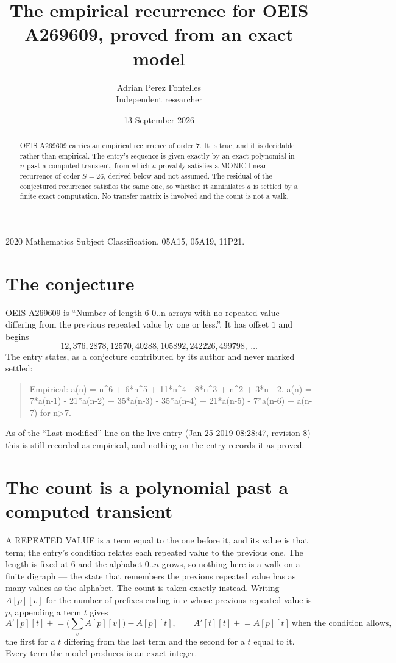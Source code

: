 \documentclass[11pt,a4paper]{article}
\title{The empirical recurrence for OEIS A269609, proved from an exact model}
\author{Adrian Perez Fontelles\\ \small Independent researcher}
\date{13 September 2026}
\theoremstyle{plain}
\theoremstyle{definition}
\begin{document}
\maketitle

\begin{abstract}
OEIS A269609 carries an empirical recurrence of order $7$. It is true, and it is
decidable rather than empirical. The entry's sequence is given exactly by an exact polynomial in $n$ past a computed transient, from
which $a$ provably satisfies a MONIC linear recurrence of order $S=26$, derived below and not
assumed. The residual of the conjectured recurrence satisfies the same one, so whether it
annihilates $a$ is settled by a finite exact computation. No transfer matrix is involved and
the count is not a walk.
\end{abstract}

\noindent\small 2020 Mathematics Subject Classification. 05A15, 05A19, 11P21.\normalsize

\section{The conjecture}

OEIS A269609 is ``Number of length-6 0..n arrays with no repeated value differing from the previous repeated value by one or less.''. It has offset $1$ and begins
\[
12, 376, 2878, 12570, 40288, 105892, 242226, 499798,\ \dots
\]
The entry states, as a conjecture contributed by its author and never marked settled:
\begin{quote}
Empirical: a(n) = n\^{}6 + 6*n\^{}5 + 11*n\^{}4 - 8*n\^{}3 + n\^{}2 + 3*n - 2. a(n) = 7*a(n-1) - 21*a(n-2) + 35*a(n-3) - 35*a(n-4) + 21*a(n-5) - 7*a(n-6) + a(n-7) for n>7.
\end{quote}
As of the ``Last modified'' line on the live entry (Jan 25 2019 08:28:47, revision 8)
this is still recorded as empirical, and nothing on the entry records it as proved.

\section{The count is a polynomial past a computed transient}

A REPEATED VALUE is a term equal to the one before it, and its value is that term; the entry's
condition relates each repeated value to the previous one. The length is fixed at $6$ and the
alphabet $0..n$ grows, so nothing here is a walk on a finite digraph --- the state that
remembers the previous repeated value has as many values as the alphabet. The count is taken
exactly instead. Writing $A[p][v]$ for the number of prefixes ending in $v$ whose previous
repeated value is $p$, appending a term $t$ gives
\[
A'[p][t] \mathrel{+}= \Big(\sum_v A[p][v]\Big) - A[p][t],
\qquad
A'[t][t] \mathrel{+}= A[p][t]\ \text{when the condition allows},
\]
the first for a $t$ differing from the last term and the second for a $t$ equal to it. Every
term the model produces is an exact integer.
\end{document}

